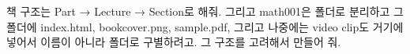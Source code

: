 책 구조는 Part  → Lecture → Section로 해줘. 그리고 math001은 폴더로 분리하고 그 폴더에 index.html, bookcover.png, sample.pdf, 그리고 나중에는 video clip도 거기에 넣어서 이름이 아니라 폴더로 구별하려고. 그 구조를 고려해서 만들어 줘.  